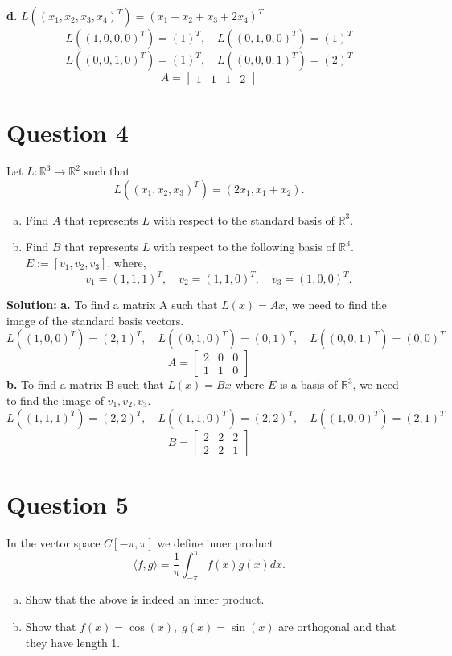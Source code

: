 \documentclass{article}
\begin{document}
\vspace{0.25cm}
\noindent\textbf{d.} $ L((x_1, x_2, x_3, x_4)^T) = (x_1 + x_2 + x_3 + 2x_4)^T $ \\
$$ L((1, 0, 0, 0)^T) = (1)^T, \quad L((0, 1, 0, 0)^T) = (1)^T $$
$$ L((0, 0, 1, 0)^T) = (1)^T, \quad L((0, 0, 0, 1)^T) = (2)^T $$
$$ A = \begin{bmatrix} 1 & 1 & 1 & 2 \end{bmatrix} $$


\section*{Question 4}
Let $L : \mathbb{R}^3 \to \mathbb{R}^2$ such that
$$ L((x_1, x_2, x_3)^T) = (2x_1, x_1 + x_2). $$
\begin{enumerate}[a.]
    \item Find $A$ that represents $L$ with respect to the standard basis of $\mathbb{R}^3$.
    \item Find $B$ that represents $L$ with respect to the following basis of $\mathbb{R}^3$. \\
    $E := [v_1, v_2, v_3]$, where, $$ v_1 = (1,1,1)^T, \quad v_2 = (1,1,0)^T, \quad v_3 = (1,0,0)^T. $$
\end{enumerate}

\noindent\textbf{Solution:}
\newline\noindent\textbf{a.} To find a matrix A such that $L(x) = Ax$, we need to find the image of the standard basis vectors.
$$ L((1, 0, 0)^T) = (2, 1)^T, \quad L((0, 1, 0)^T) = (0, 1)^T, \quad L((0, 0, 1)^T) = (0, 0)^T $$
$$ A = \begin{bmatrix} 2 & 0 & 0 \\ 1 & 1 & 0 \end{bmatrix} $$
\noindent\textbf{b.} To find a matrix B such that $L(x) = Bx$ where $E$ is a basis of $\mathbb{R}^3$, we need to find the image of $v_1, v_2, v_3$.
$$ L((1, 1, 1)^T) = (2, 2)^T, \quad L((1, 1, 0)^T) = (2, 2)^T, \quad L((1, 0, 0)^T) = (2, 1)^T $$
$$ B = \begin{bmatrix} 2 & 2 & 2 \\ 2 & 2 & 1 \end{bmatrix} $$

\section*{Question 5}
In the vector space $C[-\pi, \pi]$ we define inner product
$$ \langle f, g \rangle = \frac{1}{\pi} \int_{-\pi}^{\pi} f(x)g(x)dx. $$
\begin{enumerate}[a.]
    \item Show that the above is indeed an inner product.
    \item Show that $f(x) = \cos(x), \; g(x) = \sin(x)$ are orthogonal and that they have length 1.
\end{enumerate}
\end{document}
